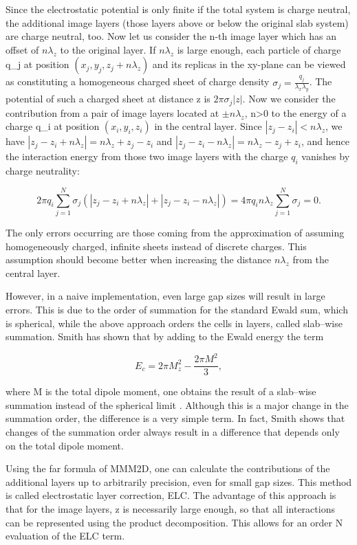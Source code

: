 Since the electrostatic potential is only finite if the total system
is charge neutral, the additional image layers (those layers above or
below the original slab system) are charge neutral, too. Now let us
consider the n-th image layer which has an offset of $n\lambda_z$ to
the original layer. If $n\lambda_z$ is large enough, each particle of
charge q\_j at position $(x_j,y_j,z_j+n\lambda_z)$ and its replicas in
the xy-plane can be viewed as constituting a homogeneous charged sheet
of charge density $\sigma_j = \frac{q_j}{\lambda_x\lambda_y}$. The
potential of such a charged sheet at distance z is $2\pi \sigma_j
|z|$. Now we consider the contribution from a pair of image layers
located at $\pm n\lambda_z$, n>0 to the energy of a charge q\_i at
position $(x_i,y_i,z_i)$ in the central layer. Since $|z_j - z_i| <
n\lambda_z$, we have $|z_j - z_i + n\lambda_z| = n\lambda_z + z_j -
z_i$ and $|z_j - z_i - n\lambda_z|= n\lambda_z - z_j + z_i$, and hence
the interaction energy from those two image layers with the charge
$q_i$ vanishes by charge neutrality:

\[ 2\pi q_i \sum_{j=1}^N \sigma_j(|z_j - z_i + n\lambda_z| + |z_j -
z_i - n\lambda_z|) = 4\pi q_i n\lambda_z \sum_{j=1}^N \sigma_j = 0. \]

The only errors occurring are those coming from the approximation of
assuming homogeneously charged, infinite sheets instead of discrete
charges. This assumption should become better when increasing the
distance $n\lambda_z$ from the central layer.

However, in a naive implementation, even large gap sizes will result
in large errors. This is due to the order of summation for the
standard Ewald sum, which is spherical, while the above approach
orders the cells in layers, called slab--wise summation. Smith has
shown that by adding to the Ewald energy the term

\[ E_c=2\pi M_z^2 - \frac{2\pi M^2}{3}, \]

where M is the total dipole moment, one obtains the result of a
slab--wise summation instead of the spherical limit \citep{smith81a}.
Although this is a major change in the summation order, the difference
is a very simple term. In fact, Smith shows that changes of the
summation order always result in a difference that depends only on the
total dipole moment.

Using the far formula of MMM2D, one can calculate the contributions of
the additional layers up to arbitrarily precision, even for small gap
sizes. This method is called electrostatic layer correction, ELC. The
advantage of this approach is that for the image layers, z is
necessarily large enough, so that all interactions can be represented
using the product decomposition. This allows for an order N evaluation
of the ELC term.

